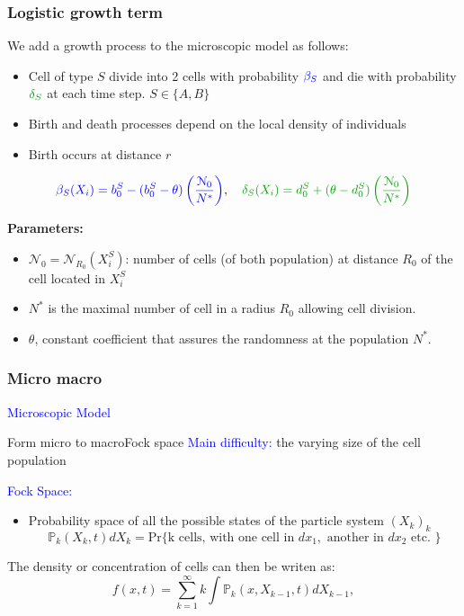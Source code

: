 \documentclass[10pt]{beamer}
\theoremstyle{remark}
\newcommand\Fontvii{\fontsize{9}{7.2}\selectfont}
\begin{document}
\begin{frame}
\frametitle{Logistic growth term}
We add a growth process to the microscopic model as follows:

\begin{itemize}
	\item  Cell of type $S$ divide into 2 cells with probability $\textcolor{blue}{\beta_S}$ and die with probability $\textcolor{remivert}{\delta_S}$ at each time step. $S \in \{ A,B\}$
	\item  Birth and death processes depend on the local density of individuals
	\item Birth occurs at distance $r$ 
	\end{itemize}
\begin{equation}
\textcolor{blue}{\beta_{S}(X_i) = b_0^{S} -(b_0^{S} - \theta)\left(\frac{\mathcal{N}_{0}}{N^{*}}\right)},
\quad
\textcolor{remivert}{\delta_{S}(X_i) = d_0^{S} + (\theta - d_0^{S}) \left(\frac{\mathcal{N}_{0}}{N^{*}}\right)}
\end{equation}


\textbf{Parameters:}
\begin{itemize}
\item $\mathcal{N}_{0}=\mathcal{N}_{R_0}(X_i^S)$: number of cells (of both population) at distance $R_0$ of the cell located in $X_i^S$ 
\item $N^*$ is the maximal number of cell in a radius $R_0$ allowing cell division. 
\item $\theta$, constant coefficient that assures the randomness at the population $N^{*}$.

\end{itemize}


\end{frame}



\begin{frame}
\frametitle{Micro macro}
\textcolor{blue}{Microscopic Model}

\end{frame}

\begin{frame}{Form micro to macro}{Fock space}
\textcolor{blue}{Main difficulty:} the varying size of the cell population
\vspace{0.5cm}

\textcolor{blue}{Fock Space:}
\begin{itemize} 
	\item Probability space of all the possible states of the particle system $(X_k)_k$
	$$ \mathbb{P}_k(X_k,t)dX_k = \text{Pr\{k cells, with one cell in }dx_1,\text{ another in } dx_2\text{ etc. \}} $$
\end{itemize}
\vspace{0.5cm}
The density or concentration of cells can then be writen as: 
	$$ f(x,t) = \sum_{k=1}^{\infty} k \int \mathbb{P}_k(x, X_{k-1}, t)dX_{k-1},$$
\end{frame}
\end{document}
